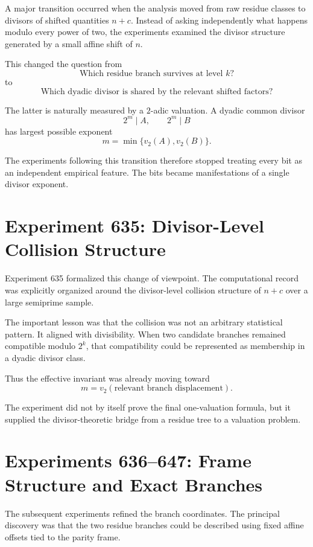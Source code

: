 \documentclass[11pt,a4paper]{article}
\newcommand{\vTwo}{v_2}
\begin{document}
A major transition occurred when the analysis moved from raw residue classes to divisors of shifted quantities $n+c$. Instead of asking independently what happens modulo every power of two, the experiments examined the divisor structure generated by a small affine shift of $n$.

This changed the question from
\[
    \text{Which residue branch survives at level }k?
\]
to
\[
    \text{Which dyadic divisor is shared by the relevant shifted factors?}
\]

The latter is naturally measured by a $2$-adic valuation. A dyadic common divisor
\[
    2^m\mid A,\qquad 2^m\mid B
\]
has largest possible exponent
\[
    m=\min\{\vTwo(A),\vTwo(B)\}.
\]

The experiments following this transition therefore stopped treating every bit as an independent empirical feature. The bits became manifestations of a single divisor exponent.

\section{Experiment 635: Divisor-Level Collision Structure}

Experiment 635 formalized this change of viewpoint. The computational record was explicitly organized around the divisor-level collision structure of $n+c$ over a large semiprime sample.

The important lesson was that the collision was not an arbitrary statistical pattern. It aligned with divisibility. When two candidate branches remained compatible modulo $2^k$, that compatibility could be represented as membership in a dyadic divisor class.

Thus the effective invariant was already moving toward
\[
    m=\vTwo(\text{relevant branch displacement}).
\]

The experiment did not by itself prove the final one-valuation formula, but it supplied the divisor-theoretic bridge from a residue tree to a valuation problem.

\section{Experiments 636--647: Frame Structure and Exact Branches}

The subsequent experiments refined the branch coordinates. The principal discovery was that the two residue branches could be described using fixed affine offsets tied to the parity frame.
\end{document}
